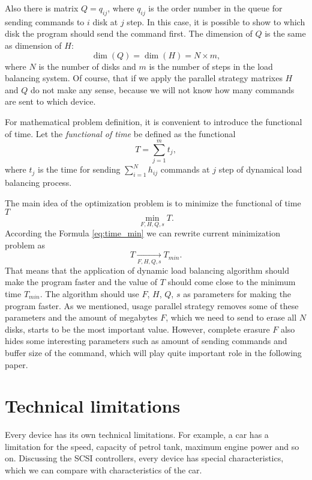 Also there is matrix $Q=q_{ij}$, where $q_{ij}$ is the order number in the queue for sending commands to $i$ disk at $j$ step. In this case, it is possible to show to which disk the program should send the command first. The dimension of $Q$ is the same as dimension of $H$: 
\begin{equation}
	\dim(Q) = \dim(H) = N \times m,
\end{equation}
where $N$ is the number of disks and $m$ is the number of steps in the load balancing system. Of course, that if we apply the parallel strategy matrixes $H$ and $Q$ do not make any sense, because we will not know how many commands are sent to which device. 

For mathematical problem definition, it is convenient to introduce the functional of time. Let the \emph{functional of time} be defined as the functional 
\begin{equation}
	T=\sum_{j=1}^{m}t_j,
\end{equation}
where $t_j$ is the time for sending $\sum_{i=1}^{N}h_{ij}$ commands at $j$ step of dynamical load balancing process.

The main idea of the optimization problem is to minimize the functional of time $T$
\begin{equation}
\label{opt_problem}
	\min_{F,H,Q,s}T.
\end{equation}
According the Formula \ref{eq:time_min} we can rewrite current minimization problem as
\begin{equation}
	T \xrightarrow[F,H,Q,s]{} T_{min}.
\end{equation}
That means that the application of dynamic load balancing algorithm should make the program faster and the value of $T$ should come close to the minimum time $T_{min}$. The algorithm should use $F$, $H$, $Q$, $s$ as parameters for making the program faster. As we mentioned, usage parallel strategy removes some of these parameters and the amount of megabytes $F$, which we need to send to erase all $N$ disks, starts to be the most important value. However, complete erasure $F$ also hides some interesting parameters such as amount of sending commands and buffer size of the command, which will play quite important role in the following paper.

\section{Technical limitations}
Every device has its own technical limitations. For example, a car has a limitation for the speed, capacity of petrol tank, maximum engine power and so on. Discussing the SCSI controllers, every device has special characteristics, which we can compare with characteristics of the car.


